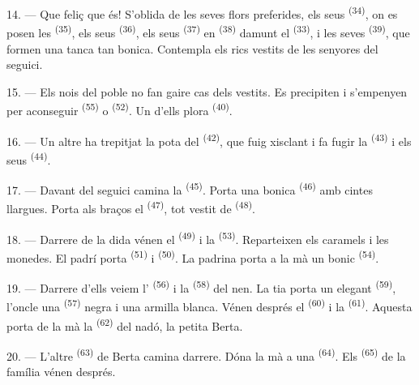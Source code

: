 14. --- Que feliç que és! S'oblida de les seves flors preferides, els seus
 \textsuperscript{(34)}, on es posen les 
\textsuperscript{(35)}, els seus  \textsuperscript{(36)}, els seus
 \textsuperscript{(37)} en  \textsuperscript{(38)} damunt el
 \textsuperscript{(33)}, i les seves
 \textsuperscript{(39)}, que formen una tanca tan bonica. Contempla
els rics vestits de les senyores del seguici.

15. --- Els nois del poble no fan gaire cas dels vestits. Es precipiten i s'empenyen per
aconseguir  \textsuperscript{(55)} o
 \textsuperscript{(52)}. Un d'ells plora
\textsuperscript{(40)}.

16. --- Un altre ha trepitjat la pota del  \textsuperscript{(42)}, que fuig
xisclant i fa fugir la  \textsuperscript{(43)} i els seus
 \textsuperscript{(44)}.

\VUsaut{5.0mm}
\VUsaut{4.0mm}

17. --- Davant del seguici camina la  \textsuperscript{(45)}. Porta una bonica
 \textsuperscript{(46)} amb cintes llargues. Porta als braços el 
\textsuperscript{(47)}, tot vestit de  \textsuperscript{(48)}.

18. --- Darrere de la dida vénen el  \textsuperscript{(49)} i la
 \textsuperscript{(53)}. Reparteixen els caramels i les monedes.
El padrí porta  \textsuperscript{(51)} i 
\textsuperscript{(50)}. La padrina porta a la mà un bonic  \textsuperscript{(54)}.

19. --- Darrere d'ells veiem l' \textsuperscript{(56)} i la
 \textsuperscript{(58)} del nen. La tia porta un elegant
 \textsuperscript{(59)}, l'oncle una 
\textsuperscript{(57)} negra i una armilla blanca. Vénen després el 
\textsuperscript{(60)} i la  \textsuperscript{(61)}. Aquesta porta de la mà la
 \textsuperscript{(62)} del nadó, la petita Berta.

20. --- L'altre  \textsuperscript{(63)} de Berta camina darrere. Dóna la mà a
una  \textsuperscript{(64)}. Els  \textsuperscript{(65)} de la
família vénen després.

